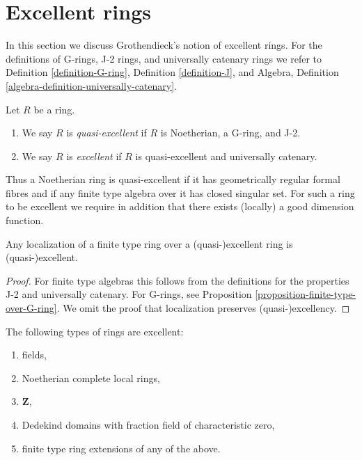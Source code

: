 \section{Excellent rings}
\label{section-excellent}

\noindent
In this section we discuss Grothendieck's notion of excellent rings.
For the definitions of G-rings, J-2 rings, and universally catenary rings
we refer to Definition \ref{definition-G-ring},
Definition \ref{definition-J}, and
Algebra, Definition \ref{algebra-definition-universally-catenary}.

\begin{definition}
\label{definition-excellent}
Let $R$ be a ring.
\begin{enumerate}
\item We say $R$ is {\it quasi-excellent} if $R$ is Noetherian,
a G-ring, and J-2.
\item We say $R$ is {\it excellent} if $R$ is quasi-excellent
and universally catenary.
\end{enumerate}
\end{definition}

\noindent
Thus a Noetherian ring is quasi-excellent if it has geometrically regular
formal fibres and if any finite type algebra over it has closed singular
set. For such a ring to be excellent we require in addition that there
exists (locally) a good dimension function.

\begin{lemma}
\label{lemma-finite-type-over-excellent}
Any localization of a finite type ring over a (quasi-)excellent ring
is (quasi-)excellent.
\end{lemma}

\begin{proof}
For finite type algebras this follows from the definitions for
the properties J-2 and universally catenary. For G-rings, see
Proposition \ref{proposition-finite-type-over-G-ring}. We omit
the proof that localization preserves (quasi-)excellency.
\end{proof}

\begin{proposition}
\label{proposition-ubiquity-excellent}
The following types of rings are excellent:
\begin{enumerate}
\item fields,
\item Noetherian complete local rings,
\item $\mathbf{Z}$,
\item Dedekind domains with fraction field of characteristic zero,
\item finite type ring extensions of any of the above.
\end{enumerate}
\end{proposition}

